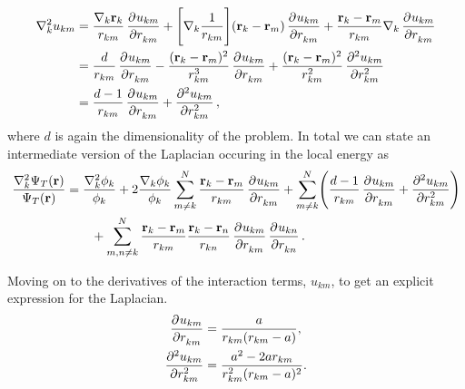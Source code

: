\documentclass[
    a4paper, aps, twocolumn, floatfix, superscriptaddress]{revtex4-1}
\newcommand{\vf}{\mathbf}
\newcommand{\1}{\mathds{1}}
\begin{document}
            \begin{widetext}
                \begin{align}
                    \nabla_k^2 u_{km}
                    &=
                    \frac{\nabla_k \vf{r}_k}{r_{km}}\dpd[]{u_{km}}{r_{km}}
                    + \Biggl[
                        \nabla_k \frac{1}{r_{km}}
                    \Biggr]
                    (\vf{r}_k - \vf{r}_m)\dpd[]{u_{km}}{r_{km}}
                    + \frac{\vf{r}_k - \vf{r}_m}{r_{km}}
                    \nabla_k \dpd[]{u_{km}}{r_{km}} \\
                    &= \frac{d}{r_{km}}\dpd[]{u_{km}}{r_{km}}
                    - \frac{(\vf{r}_k - \vf{r}_m)^2}{r_{km}^3}
                    \dpd[]{u_{km}}{r_{km}}
                    + \frac{(\vf{r}_k - \vf{r}_m)^2}{r_{km}^2}
                    \dpd[2]{u_{km}}{r_{km}} \\
                    &=
                    \frac{d - 1}{r_{km}}\dpd[]{u_{km}}{r_{km}}
                    + \dpd[2]{u_{km}}{r_{km}},
                \end{align}
                where $d$ is again the dimensionality of the problem. In total
                we can state an intermediate version of the Laplacian occuring
                in the local energy as
                \begin{align}
                    \frac{\nabla_k^2\Psi_T(\vf{r})}{\Psi_T(\vf{r})}
                    &=
                    \frac{\nabla_k^2\phi_k}{\phi_k}
                    + 2\frac{\nabla_k\phi_k}{\phi_k}
                    \sum_{m \neq k}^N
                    \frac{\vf{r}_k - \vf{r}_m}{r_{km}}
                    \dpd[]{u_{km}}{r_{km}}
                    + \sum_{m\neq k}^N
                    \Biggl(
                        \frac{d - 1}{r_{km}}\dpd[]{u_{km}}{r_{km}}
                        + \dpd[2]{u_{km}}{r_{km}}
                    \Biggr)
                    \nonumber \\
                    &\qquad
                    +
                    \sum_{m, n \neq k}^N
                    \frac{\vf{r}_k - \vf{r}_m}{r_{km}}
                    \frac{\vf{r}_k - \vf{r}_n}{r_{kn}}
                    \dpd[]{u_{km}}{r_{km}}
                    \dpd[]{u_{kn}}{r_{kn}}.
                \end{align}
            \end{widetext}
            Moving on to the derivatives of the interaction terms, $u_{km}$, to
            get an explicit expression for the Laplacian.
            \begin{align}
                \dpd[]{u_{km}}{r_{km}}
                &=
                \frac{a}{r_{km}(r_{km} - a)},
                \\
                \dpd[2]{u_{km}}{r_{km}}
                &= \frac{a^2 - 2ar_{km}}{r_{km}^2(r_{km} - a)^2}.
            \end{align}
\end{document}
